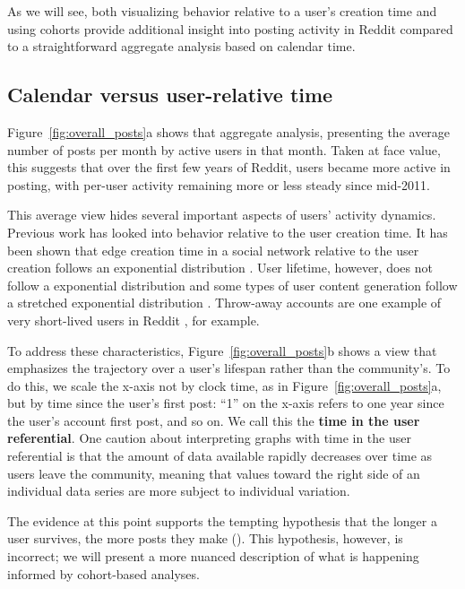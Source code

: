 As we will see, both visualizing behavior relative to a user's creation time and using cohorts provide additional insight into posting activity in Reddit compared to a straightforward aggregate analysis based on calendar time.

\subsection{Calendar versus user-relative time}

Figure~\ref{fig:overall_posts}a shows that aggregate analysis, presenting the average number of posts per month by active users in that month.  Taken at face value, this 
suggests that over the first few years of Reddit, users became more active in posting, with per-user activity remaining more or less steady since mid-2011.


This average view hides several important aspects of users' activity dynamics. Previous work has looked into behavior relative to the user creation time. It has been shown that edge creation time in a social network relative to the user creation follows an exponential distribution \cite{Tomkins2008}. User lifetime, however, does not follow a exponential distribution and some types of user content generation follow a stretched exponential distribution \cite{Guo2009}. Throw-away accounts are one example of very short-lived users in Reddit \cite{Bergstrom2011}, for example. 

To address these characteristics, Figure~\ref{fig:overall_posts}b shows a view that emphasizes the trajectory over a user's lifespan rather than the community's.  To do this, we scale the x-axis not by clock time, as in Figure~\ref{fig:overall_posts}a, but by time since the user's first post: ``1'' on the x-axis refers to one year since the user's account first post, and so on. We call this the \textbf{time in the user referential}. One caution about interpreting graphs with time in the user referential is that the amount of data available rapidly decreases over time as users leave the community, meaning that values toward the right side of an individual data series are more subject to individual variation.  

The evidence at this point supports the tempting hypothesis that the longer a user survives, the more posts they make (\Hypothesis\label{hyp:survivingMorePosts}).  This hypothesis, however, is incorrect; we will present a more nuanced description of what is happening informed by cohort-based analyses.

